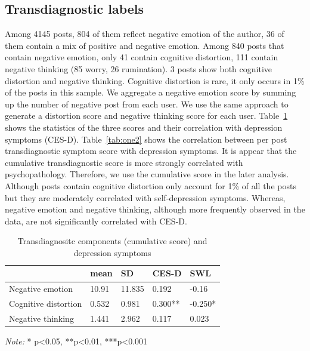 \subsection{Transdiagnostic labels}
Among 4145 posts, 804 of them reflect negative emotion of the author, 36 of them contain a mix of positive and negative emotion. Among 840 posts that contain negative emotion, only 41 contain cognitive distortion, 111 contain negative thinking (85 worry, 26 rumination). 3 posts show both cognitive distortion and negative thinking. Cognitive distortion is rare, it only occurs in 1\% of the posts in this sample. We aggregate a negative emotion score by summing up the number of negative post from each user. We use the same approach to generate a distortion score and negative thinking score for each user. Table~\ref{tab:one} shows the statistics of the three scores  and their correlation with depression symptoms (CES-D). Table~\ref{tab:one2} shows the correlation between per post transdiagnostic symptom score with depression symptoms. It is appear that the cumulative transdiagnostic score is more strongly correlated with psychopathology. Therefore, we use the cumulative score in the later analysis. Although posts contain cognitive distortion only account for 1\% of all the posts but they are moderately correlated with self-depression symptoms. Whereas, negative emotion and negative thinking, although more frequently observed in the data, are not significantly correlated with CES-D.


\begin{table}%
\caption{Transdiagnositc components (cumulative score) and depression symptoms}
\label{tab:one}
\begin{minipage}{\columnwidth}
\begin{center}
\begin{tabular}{lllll}
  \toprule
        & mean	& SD   & CES-D & SWL \\ 
  \hline\hline
  Negative emotion  & 10.91 & 11.835 &0.192 & -0.16\\
  Cognitive distortion  & 0.532 & 0.981 &0.300** & -0.250* \\
  Negative thinking  & 1.441 & 2.962 &0.117& 0.023\\

  \bottomrule
\end{tabular}
\end{center}
\bigskip\centering

 \emph{Note:} * p<0.05, **p<0.01, ***p<0.001
\end{minipage}
\end{table}%

